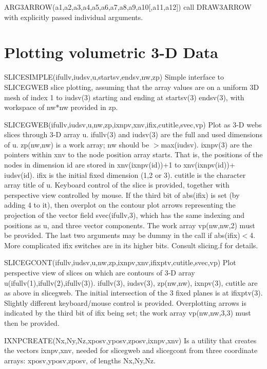 \documentclass[12pt]{article}
\newif \iftth
\begin{document}
ARG3ARROW(a1,a2,a3,a4,a5,a6,a7,a8,a9,a10[,a11,a12]) call DRAW3ARROW
with explicitly passed individual arguments.

\section{Plotting volumetric 3-D Data}

\iftth \special{html:<a href="slicetest.f"><img align="left"
src="sgweb.jpg" width="400"></a>}\fi


SLICESIMPLE(ifullv,iudsv,u,startsv,endsv,nw,zp) Simple interface to
SLICEGWEB slice plotting, assuming that the array values are on a
uniform 3D mesh of index 1 to iudsv(3) starting and ending at startsv(3)
endsv(3), with workspace of nw*nw provided in zp.


SLICEGWEB(ifullv,iudsv,u,nw,zp,ixnpv,xnv,ifix,cutitle,svec,vp) Plot
as 3-D webs slices through 3-D array u. ifullv(3) and iudsv(3) are the
full and used dimensions of u. zp(nw,nw) is a work array; nw should be
$>$max(iudsv). ixnpv(3) are the pointers within xnv to the node
position array starts. That is, the positions of the nodes in
dimension id are stored in xnv(ixnpv(id))+1 to xnv(ixnpv(id))+
iudsv(id). ifix is the initial fixed dimension (1,2 or 3). cutitle is
the character array title of u. Keyboard control of the slice is
provided, together with perspective view controlled by mouse. If the
third bit of abs(ifix) is set (by adding 4 to it), then overplot on
the contour plot arrows representing the projection of the vector
field svec(ifullv,3), which has the same indexing and positions as u,
and three vector components. The work array vp(nw,nw,2) must be
provided.  The last two arguments may be dummy in the call if
abs(ifix)$<$4. More complicated ifix switches are in its higher bits.
Consult slicing.f for details.

\iftth \special{html:<a href="slicetest.f"><img align="right"
src="sgcont.jpg" width="300"></a>}\fi

SLICEGCONT(ifullv,iudsv,u,nw,zp,ixnpv,xnv,ifixptv,cutitle,svec,vp) Plot
perspective view of slices on which are contours of 3-D array
u(ifullv(1),ifullv(2),ifullv(3)). ifullv(3), iudsv(3), zp(nw,nw),
ixnpv(3), cutitle are as above in slicegweb. The initial intersection
of the 3 fixed planes is at ifixptv(3). Slightly different
keyboard/mouse control is provided. Overplotting arrows is indicated
by the third bit of ifix being set; the work array vp(nw,nw,3,3)
must then be provided.

IXNPCREATE(Nx,Ny,Nz,xposv,yposv,zposv,ixnpv,xnv) Is a utility that
creates the vectors ixnpv,xnv, needed for slicegweb and slicegcont
from three coordinate arrays: xposv,yposv,zposv, of lengths Nx,Ny,Nz.
\end{document}
